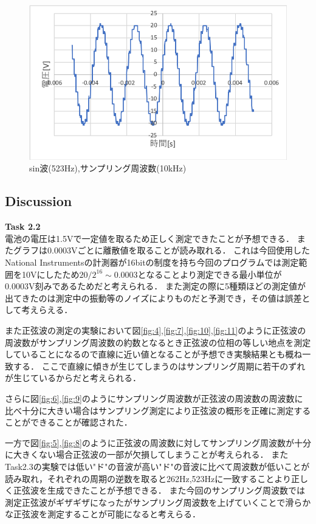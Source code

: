 \documentclass[11pt, a4paper,twocolumn]{jarticle}
\begin{document}
\begin{figure}[htbp]
 \begin{center}
  \includegraphics[width=0.8\linewidth]{fig14.png}
 \end{center}
 \caption{sin波(523Hz),サンプリング周波数(10kHz)}
 \label{fig:14}
\end{figure}

\subsection{Discussion}
\noindent
\textbf{Task 2.2} \\
電池の電圧は1.5Vで一定値を取るため正しく測定できたことが予想できる．
またグラフは0.0003Vごとに離散値を取ることが読み取れる．
これは今回使用したNational Instrumentsの計測器が16bitの制度を持ち今回のプログラムでは測定範囲を10Vにしたため$20/2^{16} \sim 0.0003$となることより測定できる最小単位が0.0003V刻みであるためだと考えられる．
また測定の際に5種類ほどの測定値が出てきたのは測定中の振動等のノイズによりものだと予測でき，その値は誤差として考えらえる．

また正弦波の測定の実験において図\ref{fig:4},\ref{fig:7},\ref{fig:10},\ref{fig:11}のように正弦波の周波数がサンプリング周波数の約数となるとき正弦波の位相の等しい地点を測定していることになるので直線に近い値となることが予想でき実験結果とも概ね一致する．
ここで直線に傾きが生じてしまうのはサンプリング周期に若干のずれが生じているからだと考えられる．

さらに図\ref{fig:6},\ref{fig:9}のようにサンプリング周波数が正弦波の周波数の周波数に比べ十分に大きい場合はサンプリング測定により正弦波の概形を正確に測定することができることが確認された．

一方で図\ref{fig:5},\ref{fig:8}のように正弦波の周波数に対してサンプリング周波数が十分に大きくない場合正弦波の一部が欠損してしまうことが考えられる．
またTask2.3の実験では低い"ド"の音波が高い"ド"の音波に比べて周波数が低いことが読み取れ，それぞれの周期の逆数を取ると262Hz,523Hzに一致することより正しく正弦波を生成できたことが予想できる．
また今回のサンプリング周波数では測定正弦波がギザギザになったがサンプリング周波数を上げていくことで滑らかな正弦波を測定することが可能になると考えらる．
\newpage
\end{document}
